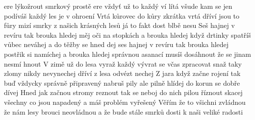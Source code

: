 \ve{}
ere lýkožrout smrkový
prostě ere vždyť už to každý ví
lítá všude kam se jen podíváš
každý les je v ohroení
\ve{}
Vrtá kůrovec do kůry zkrátka vrtá
dříví jsou to fůry mizí smrky
z našich krásných lesů
já to fakt dost blbě nesu
\cho{}
Seš hajnej v revíru tak brouka hledej
měj oči na stopkách a brouka hledej
když drtinky spatříš vůbec neváhej
a do těžby se hned dej
ses hajnej v revíru tak brouka hledej
postřik si namíchej a  brouka hledej
správnou asanací musíš dosáhnout
že se jinam nesmí hnout
\ve{}
V zimě už do lesa vyraž
každý vývrat se včas zpracovat snaž
taky zlomy nikdy nevynechej
dříví z lesa odvézt nechej
Z jara když začne rojení
tak buď vždycky správně připravený
nabruš pily ale pilně hlídej
do korun se dobře dívej
\cho{}
\ve{}
Hned jak začnou stromy reznout
tak se neboj do nich pilou říznout
skacej všechny co jsou napadený
a máš problém vyřešený
Věřím že to všichni zvládnou
že nám lesy brouci neovládnou
a že bude stále smrků dosti
k naši veliké radosti
\cho{}
\esong{}